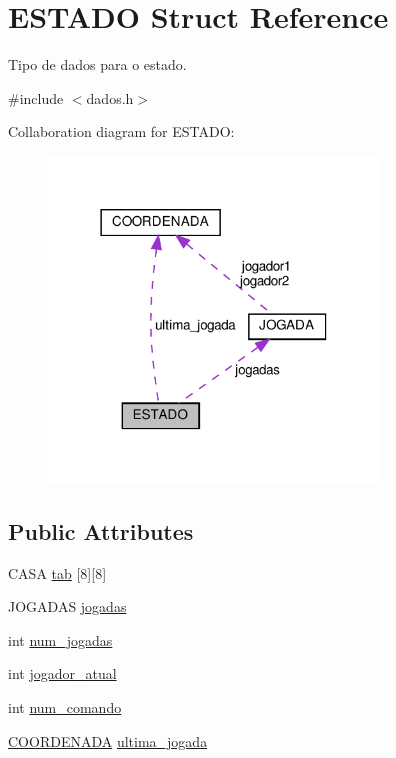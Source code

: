 \hypertarget{structESTADO}{}\section{E\+S\+T\+A\+DO Struct Reference}
\label{structESTADO}


Tipo de dados para o estado.  




{\ttfamily \#include $<$dados.\+h$>$}



Collaboration diagram for E\+S\+T\+A\+DO\+:
\nopagebreak
\begin{figure}[H]
\begin{center}
\leavevmode
\includegraphics[width=249pt]{structESTADO__coll__graph}
\end{center}
\end{figure}
\subsection*{Public Attributes}
\begin{DoxyCompactItemize}
\item 
C\+A\+SA \hyperlink{structESTADO_ab56f0f1be16954d3768b4174d14c087d}{tab} \mbox{[}8\mbox{]}\mbox{[}8\mbox{]}
\item 
J\+O\+G\+A\+D\+AS \hyperlink{structESTADO_afae43b87a488fad0f2b56a18bad31d18}{jogadas}
\item 
int \hyperlink{structESTADO_a261495728744647e618b4e623f5a4b7a}{num\+\_\+jogadas}
\item 
int \hyperlink{structESTADO_a5dd28e2e68b7aef2b6b7ea88e02eff58}{jogador\+\_\+atual}
\item 
int \hyperlink{structESTADO_adf1064dfc09145b6995a7897249f1674}{num\+\_\+comando}
\item 
\hyperlink{structCOORDENADA}{C\+O\+O\+R\+D\+E\+N\+A\+DA} \hyperlink{structESTADO_a4896a5c5c1f40b43fb795623327e3f47}{ultima\+\_\+jogada}
\end{DoxyCompactItemize}


